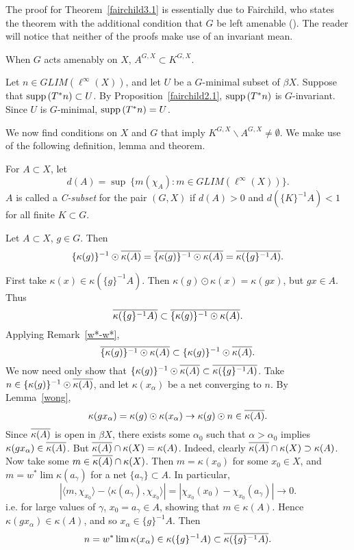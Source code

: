 \begin{remark}
The proof for Theorem~\ref{fairchild3.1} is essentially due to Fairchild, who
states the theorem with the additional condition that $G$ be left amenable
(\cite[p. 85]{fairchild}).  The reader will notice that neither of the proofs make use
of an invariant mean.
\end{remark}

\begin{corollary}
When $G$ acts amenably on $X$, $A^{G,X} \subset K^{G,X}$.
\end{corollary}
\proof
Let $n\in GLIM(\ell^\infty(X))$, and let $U$ be a $G$-minimal subset of $\beta X$.  Suppose that $\operatorname{supp\,} (T^*n) \subset U$.
By Proposition~\ref{fairchild2.1}, $\operatorname{supp\,} (T^*n)$ is $G$-invariant.  Since $U$ is $G$-minimal,
$\operatorname{supp\,} (T^*n) = U$.
\done

We now find conditions on $X$ and $G$ that imply $K^{G,X}\backslash A^{G,X} \neq \emptyset$.
We make use of the following definition, lemma and theorem.

\begin{defn}
For $A \subset X$, let
\[
d(A) = \sup\:\{ m(\chi_A) : m\in GLIM(\ell^\infty(X)) \}.
\]
$A$ is called a {\it C-subset} for the pair  $(G,X)$ if $d(A) > 0$ and $d(\{K\}^{-1}A) < 1$ for all
finite $K\subset G$.
\end{defn}

\begin{lemma}\label{fairchild3.3}
Let $A \subset X$, $g\in G$.  Then
\[
\{\kappa(g)\}^{-1} \odot \overline{\kappa(A)} = \overline{ \{\kappa(g)\}^{-1} \odot \kappa(A)} = \overline{\kappa(\{g\}^{-1}A)}.
\]
\end{lemma}
\proof
First take $\kappa(x) \in \kappa(\{g\}^{-1}A)$.  Then $\kappa(g) \odot \kappa(x) = \kappa(gx)$, but $gx \in A$.
Thus
\[
\overline{\kappa(\{g\}^{-1}A)} \subset \overline{ \{\kappa(g)\}^{-1} \odot \kappa(A)}.
\]
Applying Remark~\ref{w*-w*},
\[
\overline{ \{\kappa(g)\}^{-1} \odot \kappa(A)} \subset \{\kappa(g)\}^{-1} \odot \overline{\kappa(A)}.
\]
We now need only show that $\{\kappa(g)\}^{-1} \odot \overline{\kappa(A)} \subset \overline{\kappa(\{g\}^{-1}A)}$.
Take $n\in \{\kappa(g)\}^{-1} \odot \overline{\kappa(A)}$, and let $\kappa(x_\alpha)$ be a net converging to $n$.
By Lemma~\ref{wong},
\[
\kappa(gx_\alpha) = \kappa(g) \odot \kappa(x_\alpha) \rightarrow \kappa(g) \odot n \in \overline{\kappa(A)}.
\]
Since $\overline{\kappa(A)}$ is open in $\beta X$, there exists some $\alpha_0$ such that $\alpha > \alpha_0$
implies $\kappa(gx_\alpha) \in \overline{\kappa(A)}$.  But $\overline{\kappa(A)}\cap\kappa(X) = \kappa(A)$.  Indeed, clearly
$\overline{\kappa(A)}\cap\kappa(X) \supset \kappa(A)$.  Now take some $m\in \overline{\kappa(A)}\cap\kappa(X)$.
Then $m = \kappa(x_0)$ for some $x_0 \in X$, and $m=w^*\lim\kappa(a_\gamma)$ for a net $\{a_\gamma\}\subset A$.
In particular,
\[
|\langle m,\chi_{x_0}\rangle - \langle \kappa(a_\gamma), \chi_{x_0}\rangle | = |\chi_{x_0}(x_0) - \chi_{x_0}(a_\gamma)| \rightarrow 0.
\]
i.e. for large values of $\gamma$, $x_0 = a_\gamma \in A$, showing that $m \in \kappa(A)$.
Hence $\kappa(gx_\alpha) \in \kappa(A)$, and so $x_\alpha \in \{g\}^{-1}A$.
Then
\[
n  = w^* \lim \kappa(x_\alpha) \in \kappa(\{g\}^{-1}A) \subset \overline{\kappa(\{g\}^{-1}A)}.
\]
\done

